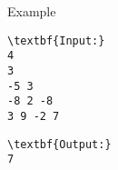 Example
\begin{verbatim}
\textbf{Input:}
4
3
-5 3
-8 2 -8
3 9 -2 7 \end{verbatim}
\begin{verbatim}
\textbf{Output:}
7\end{verbatim}